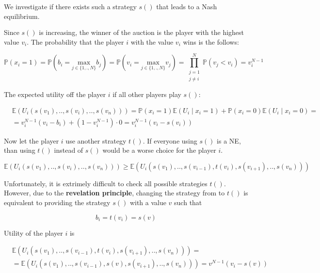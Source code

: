 We investigate if there exists such a strategy $s()$ that leads to a Nash equilibrium.

Since $s()$ is increasing, the winner of the auction is the player with the highest value $v_i$. The probability that the player $i$ with the value $v_i$ wins is the follows:

\begin{equation}
	\mathbb{P}(x_i = 1) = \mathbb{P}\left(b_i = \underset{j \in \{1,.,N\}}{\text{max}} b_j \right) = \mathbb{P}\left(v_i = \underset{j \in \{1,.,N\}}{\text{max}} v_j \right) = \prod_{\substack{j = 1 \\ j \neq i}}^N \mathbb{P}(v_j < v_i) = v_i^{N-1}
\end{equation} 

The expected utility off the player $i$ if all other players play $s()$:

\begin{equation}\label{eq:s-utility}
\begin{aligned}
	& \mathbb{E}\left(U_i(s(v_1),..,s(v_i),..,s(v_n))\right) = \mathbb{P}(x_i = 1) \mathbb{E}(U_i \mid x_i = 1) + \mathbb{P}(x_i = 0) \mathbb{E}(U_i \mid x_i = 0) = \\ 
	& = v_i^{N-1} (v_i-b_i) + \left(1 - v_i^{N-1}\right) \cdot 0 = v_i^{N-1} (v_i-s(v_i))
\end{aligned}
\end{equation}

Now let the player $i$ use another strategy $t()$. If everyone using $s()$ is a NE, than using $t()$ instead of $s()$ would be a worse choice for the player $i$.

\begin{equation}\label{eq:ne-condition}
\mathbb{E}\left(U_i(s(v_1),..,s(v_i),..,s(v_n))\right) \ge \mathbb{E}\left(U_i(s(v_1),..,s(v_{i-1}),t(v_i),s(v_{i+1}),..,s(v_n))\right)
\end{equation}

Unfortunately, it is extrimely difficult to check all possible strategies $t()$. However, due to the \textbf{revelation principle}, changing the strategy from to $t()$ is equivalent to providing the strategy $s()$ with a value $v$ such that

\begin{equation}
b_i = t(v_i) = s(v)
\end{equation}

Utility of the player $i$ is

\begin{equation}\label{eq:t-utility}
\begin{aligned}
	& \mathbb{E}\left(U_i(s(v_1),..,s(v_{i-1}), t(v_i),s(v_{i+1}),..,s(v_n))\right) = \\
	& = \mathbb{E}\left(U_i(s(v_1),..,s(v_{i-1}), s(v),s(v_{i+1}),..,s(v_n))\right) = v^{N-1}(v_i-s(v))
\end{aligned}
\end{equation}

